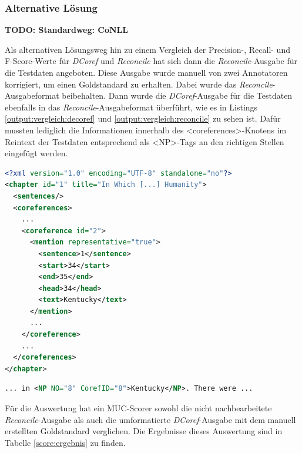 \documentclass[a4paper,12pt,titlepage=true, ngerman]{scrartcl}
\begin{document}

\subsubsection{Alternative Lösung}%

\textbf{TODO: Standardweg: CoNLL}

Als alternativen Lösungsweg hin zu einem Vergleich der Precision-, Recall- und F-Score-Werte für \emph{DCoref} 
und \emph{Reconcile} hat sich dann die \emph{Reconcile}-Ausgabe für die Testdaten angeboten. 
Diese Ausgabe wurde manuell von zwei Annotatoren korrigiert, um einen Goldstandard zu erhalten. 
Dabei wurde das \emph{Reconcile}-Ausgabeformat beibehalten. 
Dann wurde die \emph{DCoref}-Ausgabe für die Testdaten ebenfalls in das \emph{Reconcile}-Ausgabeformat überführt, 
wie es in Listings  \ref{output:vergleich:decoref} und \ref{output:vergleich:reconcile} zu sehen ist. 
Dafür mussten lediglich die Informationen innerhalb des <coreferences>-Knotens im Reintext der Testdaten 
entsprechend als <NP>-Tags an den richtigen Stellen eingefügt werden.

\begin{lstlisting}[label=output:vergleich:decoref, name=vergleich_decoref.xml, language=xml, caption=Ausschnitt der \emph{DCoref}-Ausgabe für die Testdaten]
<?xml version="1.0" encoding="UTF-8" standalone="no"?>
<chapter id="1" title="In Which [...] Humanity">
  <sentences/>
  <coreferences>
    ...
    <coreference id="2">
      <mention representative="true">
        <sentence>1</sentence>
        <start>34</start>
        <end>35</end>
        <head>34</head>
        <text>Kentucky</text>
      </mention>
      ...
    </coreference>
    ...
  </coreferences>
</chapter>
\end{lstlisting}

\begin{lstlisting}[label=output:vergleich:reconcile, name=vergleich_reconcile.xml, language=xml, caption=Ausschnitt aus Listing \ref{output:vergleich:reconcile} im \emph{Reconcile}-Ausgabeformat]
... in <NP NO="8" CorefID="8">Kentucky</NP>. There were ...
\end{lstlisting}

\noindent 
Für die Auswertung hat ein MUC-Scorer sowohl die nicht nachbearbeitete \emph{Reconcile}-Ausgabe als auch 
die umformatierte \emph{DCoref}-Ausgabe mit dem manuell erstellten Goldstandard verglichen. 
Die Ergebnisse dieses Auswertung sind in Tabelle \ref{score:ergebnis} zu finden.
\end{document}
